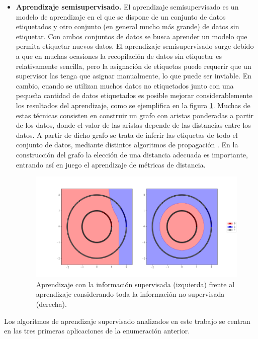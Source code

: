 \documentclass{book}
\begin{document}
\begin{itemize}
	\item \textbf{Aprendizaje semisupervisado.} El aprendizaje semisupervisado es un modelo de aprendizaje en el que se dispone de un conjunto de datos etiquetados y otro conjunto (en general mucho más grande) de datos sin etiquetar. Con ambos conjuntos de datos se busca aprender un modelo que permita etiquetar nuevos datos. El aprendizaje semisupervisado surge debido a que en muchas ocasiones la recopilación de datos sin etiquetar es relativamente sencilla, pero la asignación de etiquetas puede requerir que un supervisor las tenga que asignar manualmente, lo que puede ser inviable. En cambio, cuando se utilizan muchos datos no etiquetados junto con una pequeña cantidad de datos etiquetados es posible mejorar considerablemente los resultados del aprendizaje, como se ejemplifica en la figura \ref{fig:ssl}. Muchas de estas técnicas consisten en construir un grafo con aristas ponderadas a partir de los datos, donde el valor de las aristas depende de las distancias entre los datos. A partir de dicho grafo se trata de inferir las etiquetas de todo el conjunto de datos, mediante distintos algoritmos de propagación \cite{ssl1,ssl2}. En la construcción del grafo la elección de una distancia adecuada es importante, entrando así en juego el aprendizaje de métricas de distancia.

	\begin{figure}[h]
	\centering
	\includegraphics[width=\textwidth]{./images/ssl.png}
	\caption{Aprendizaje con la información supervisada (izquierda) frente al aprendizaje considerando toda la información no supervisada (derecha).} \label{fig:ssl}
	\end{figure}

\end{itemize}

Los algoritmos de aprendizaje supervisado analizados en este trabajo se centran en las tres primeras aplicaciones de la enumeración anterior.
\end{document}

